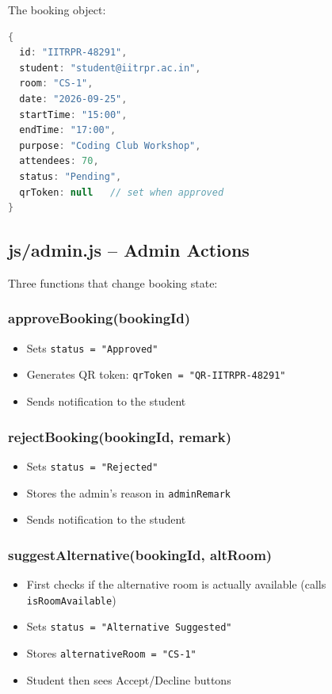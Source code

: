 \documentclass[12pt,a4paper]{article}
\begin{document}
The booking object:
\begin{lstlisting}[language=Java]
{
  id: "IITRPR-48291",
  student: "student@iitrpr.ac.in",
  room: "CS-1",
  date: "2026-09-25",
  startTime: "15:00",
  endTime: "17:00",
  purpose: "Coding Club Workshop",
  attendees: 70,
  status: "Pending",
  qrToken: null   // set when approved
}
\end{lstlisting}

\subsection{js/admin.js -- Admin Actions}

Three functions that change booking state:

\subsubsection{approveBooking(bookingId)}
\begin{itemize}
  \item Sets \texttt{status = "Approved"}
  \item Generates QR token: \texttt{qrToken = "QR-IITRPR-48291"}
  \item Sends notification to the student
\end{itemize}

\subsubsection{rejectBooking(bookingId, remark)}
\begin{itemize}
  \item Sets \texttt{status = "Rejected"}
  \item Stores the admin's reason in \texttt{adminRemark}
  \item Sends notification to the student
\end{itemize}

\subsubsection{suggestAlternative(bookingId, altRoom)}
\begin{itemize}
  \item First checks if the alternative room is actually available (calls \texttt{isRoomAvailable})
  \item Sets \texttt{status = "Alternative Suggested"}
  \item Stores \texttt{alternativeRoom = "CS-1"}
  \item Student then sees Accept/Decline buttons
\end{itemize}
\end{document}
